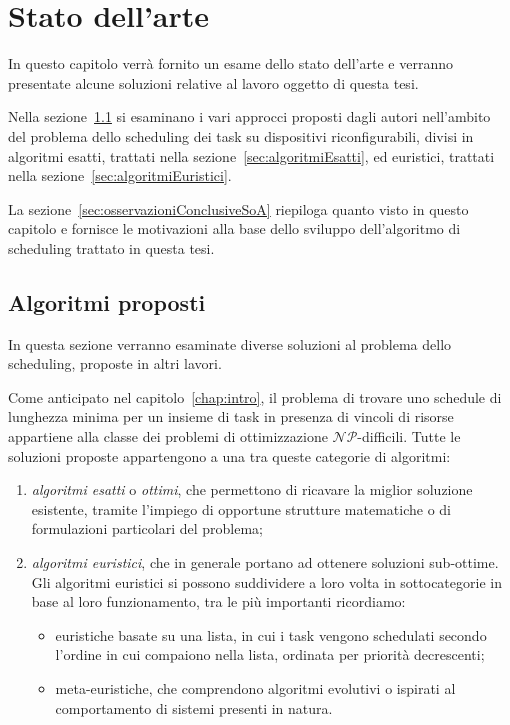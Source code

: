 \chapter{Stato dell'arte}
\label{chap:SOA}
\vspace{1cm}
In questo capitolo verrà fornito un esame dello stato dell'arte e verranno presentate 
alcune soluzioni relative al lavoro oggetto di questa tesi.

Nella sezione~\ref{sec:algoritmiProposti} si esaminano i vari approcci proposti 
dagli autori nell'ambito del problema dello scheduling dei task su dispositivi 
riconfigurabili, divisi in algoritmi esatti, trattati nella
sezione~\ref{sec:algoritmiEsatti}, ed euristici, trattati nella
sezione~\ref{sec:algoritmiEuristici}.

La sezione~\ref{sec:osservazioniConclusiveSoA} riepiloga quanto visto in questo capitolo
e fornisce le motivazioni alla base dello sviluppo dell'algoritmo di scheduling
trattato in questa tesi.

\newpage

\section{Algoritmi proposti}
\label{sec:algoritmiProposti}
In questa sezione verranno esaminate diverse soluzioni al problema dello 
scheduling, proposte in altri lavori.

Come anticipato nel capitolo~\ref{chap:intro}, il problema di trovare uno 
schedule di lunghezza minima per un insieme di task in presenza di vincoli di 
risorse appartiene alla classe dei problemi di ottimizzazione 
$\mathcal{NP}$-difficili. Tutte le soluzioni proposte appartengono a una 
tra queste categorie di algoritmi:
\begin{enumerate}
 \item \emph{algoritmi esatti} o \emph{ottimi}, che permettono di ricavare la 
miglior soluzione esistente, tramite l'impiego di opportune strutture matematiche o di 
formulazioni particolari del problema;
 \item \emph{algoritmi euristici}, che in generale portano ad ottenere 
soluzioni sub-ottime. Gli algoritmi euristici si possono suddividere a loro 
volta in sottocategorie in base al loro funzionamento, tra le più importanti 
ricordiamo:
 \begin{itemize}
  \item euristiche basate su una lista, in cui i task vengono schedulati 
secondo l'ordine in cui compaiono nella lista, ordinata per priorità decrescenti;
  \item meta-euristiche, che comprendono algoritmi evolutivi o ispirati al 
comportamento di sistemi presenti in natura.
 \end{itemize}
\end{enumerate}

